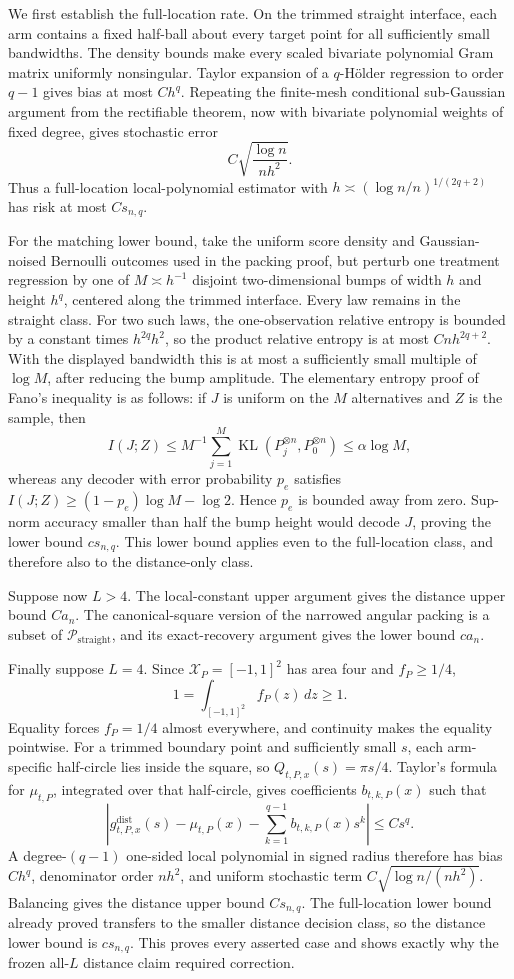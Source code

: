 We first establish the full-location rate.  On the trimmed straight interface, each arm contains a fixed half-ball about every target point for all sufficiently small bandwidths.  The density bounds make every scaled bivariate polynomial Gram matrix uniformly nonsingular.  Taylor expansion of a \(q\)-H\"older regression to order \(q-1\) gives bias at most \(Ch^q\).  Repeating the finite-mesh conditional sub-Gaussian argument from the rectifiable theorem, now with bivariate polynomial weights of fixed degree, gives stochastic error
\[
 C\sqrt{\frac{\log n}{nh^2}}.
\]
Thus a full-location local-polynomial estimator with
\(h\asymp(\log n/n)^{1/(2q+2)}\) has risk at most \(Cs_{n,q}\).

For the matching lower bound, take the uniform score density and Gaussian-noised Bernoulli outcomes used in the packing proof, but perturb one treatment regression by one of \(M\asymp h^{-1}\) disjoint two-dimensional bumps of width \(h\) and height \(h^q\), centered along the trimmed interface.  Every law remains in the straight class.  For two such laws, the one-observation relative entropy is bounded by a constant times
\(h^{2q}h^2\), so the product relative entropy is at most \(Cnh^{2q+2}\).  With the displayed bandwidth this is at most a sufficiently small multiple of \(\log M\), after reducing the bump amplitude.  The elementary entropy proof of Fano's inequality is as follows: if \(J\) is uniform on the \(M\) alternatives and \(Z\) is the sample, then
\[
 I(J;Z)\leq M^{-1}\sum_{j=1}^M\operatorname{KL}(P_j^{\otimes n},P_0^{\otimes n})
 \leq\alpha\log M,
\]
whereas any decoder with error probability \(p_e\) satisfies
\(I(J;Z)\geq(1-p_e)\log M-\log2\).  Hence \(p_e\) is bounded away from zero.  Sup-norm accuracy smaller than half the bump height would decode \(J\), proving the lower bound \(cs_{n,q}\).  This lower bound applies even to the full-location class, and therefore also to the distance-only class.

Suppose now \(L>4\).  The local-constant upper argument gives the distance upper bound \(Ca_n\).  The canonical-square version of the narrowed angular packing is a subset of \(\mathcal P_{\mathrm{straight}}\), and its exact-recovery argument gives the lower bound \(ca_n\).

Finally suppose \(L=4\).  Since \(\mathcal X_P=[-1,1]^2\) has area four and \(f_P\geq1/4\),
\[
 1=\int_{[-1,1]^2}f_P(z)\,dz\geq1.
\]
Equality forces \(f_P=1/4\) almost everywhere, and continuity makes the equality pointwise.  For a trimmed boundary point and sufficiently small \(s\), each arm-specific half-circle lies inside the square, so \(Q_{t,P,x}(s)=\pi s/4\).  Taylor's formula for \(\mu_{t,P}\), integrated over that half-circle, gives coefficients \(b_{t,k,P}(x)\) such that
\[
 \left|g^{\mathrm{dist}}_{t,P,x}(s)-\mu_{t,P}(x)-\sum_{k=1}^{q-1}b_{t,k,P}(x)s^k\right|\leq Cs^q.
\]
A degree-\((q-1)\) one-sided local polynomial in signed radius therefore has bias \(Ch^q\), denominator order \(nh^2\), and uniform stochastic term \(C\sqrt{\log n/(nh^2)}\).  Balancing gives the distance upper bound \(Cs_{n,q}\).  The full-location lower bound already proved transfers to the smaller distance decision class, so the distance lower bound is \(cs_{n,q}\).  This proves every asserted case and shows exactly why the frozen all-\(L\) distance claim required correction.